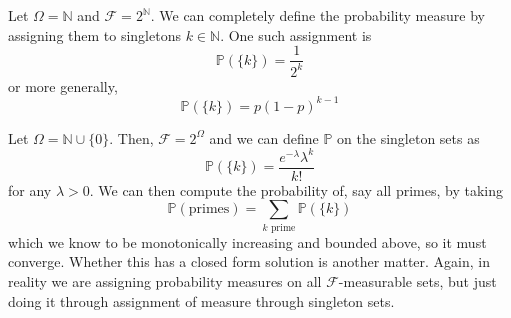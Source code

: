   \begin{example}
    \label{ex:geometric-measure-on-n}
    Let $\Omega = \mathbb{N}$ and $\mathcal{F} = 2^\mathbb{N}$. We can completely define the probability measure by assigning them to singletons $k \in \mathbb{N}$. One such assignment is 
    \begin{equation}
      \mathbb{P}(\{k\}) = \frac{1}{2^k}
    \end{equation}
    or more generally, 
    \begin{equation}
      \mathbb{P}(\{k\}) = p (1 - p)^{k-1}
    \end{equation}
  \end{example}

  \begin{example}
    \label{ex:poisson-measure-on-n0}
    Let $\Omega = \mathbb{N} \cup \{0\}$. Then, $\mathcal{F} = 2^\Omega$ and we can define $\mathbb{P}$ on the singleton sets as 
    \begin{equation}
      \mathbb{P}(\{k\}) = \frac{e^{-\lambda} \lambda^k}{k!}
    \end{equation}
    for any $\lambda > 0$. We can then compute the probability of, say all primes, by taking 
    \begin{equation}
      \mathbb{P}(\text{primes}) = \sum_{k \text{ prime}} \mathbb{P}(\{k\})
    \end{equation}
    which we know to be monotonically increasing and bounded above, so it must converge. Whether this has a closed form solution is another matter. Again, in reality we are assigning probability measures on all $\mathcal{F}$-measurable sets, but just doing it through assignment of measure through singleton sets. 
  \end{example}
  
